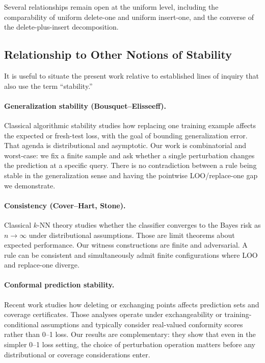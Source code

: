 


Several relationships remain open at the uniform level, including the
comparability of uniform delete-one and uniform insert-one, and the converse of
the delete-plus-insert decomposition.

\subsection{Relationship to Other Notions of Stability}

It is useful to situate the present work relative to established lines of
inquiry that also use the term ``stability.''

\paragraph{Generalization stability (Bousquet--Elisseeff).}
Classical algorithmic stability \cite{bousquet2002stability} studies how
replacing one training example affects the expected or fresh-test loss, with
the goal of bounding generalization error. That agenda is distributional and
asymptotic. Our work is combinatorial and worst-case: we fix a finite sample
and ask whether a single perturbation changes the prediction at a specific
query. There is no contradiction between a rule being stable in the
generalization sense and having the pointwise LOO/replace-one gap we
demonstrate.

\paragraph{Consistency (Cover--Hart, Stone).}
Classical $k$-NN theory \cite{cover1967nearest,stone1977consistent} studies
whether the classifier converges to the Bayes risk as $n \to \infty$ under
distributional assumptions. Those are limit theorems about expected performance.
Our witness constructions are finite and adversarial. A rule can be consistent
and simultaneously admit finite configurations where LOO and replace-one
diverge.

\paragraph{Conformal prediction stability.}
Recent work \cite{liang2023algorithmic,pournaderi2024training} studies how
deleting or exchanging points affects prediction sets and coverage certificates.
Those analyses operate under exchangeability or training-conditional assumptions
and typically consider real-valued conformity scores rather than 0--1 loss. Our
results are complementary: they show that even in the simpler 0--1 loss setting,
the choice of perturbation operation matters before any distributional or
coverage considerations enter.

